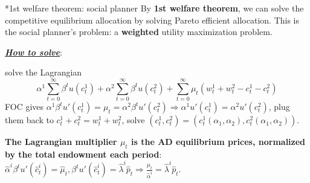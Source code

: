 \documentclass[10pt,landscape,a4paper]{article}
\makeatletter
\renewcommand{\subsubsection}{\@startsection{subsubsection}{1}{0mm}{.2ex}{.2ex}{\bfseries}}
\makeatother
\begin{document}
\begin{multicols*}{3}
\subsubsection*{1st welfare theorem: social planner}
By \textbf{1st welfare theorem}, we can solve the competitive equilibrium allocation by solving Pareto efficient allocation. This is the social planner's problem: a \textbf{weighted} utility maximization problem.

\vspace{2pt}

\vspace{2pt}
\underline{\textit{\textbf{How to solve}}}:
        
solve the Lagrangian
$$\alpha^1 \sum^{\infty}_{t=0}\beta^t u(c_t^1)+\alpha^2 \sum^{\infty}_{t=0}\beta^t u(c_t^2)+\sum^{\infty}_{t=0}\mu_t\left(w_t^1+w_t^2-c_t^1-c_t^2\right)$$
FOC gives $\alpha^1\beta^t u'(c_t^1)=\mu_t=\alpha^2\beta^t u'(c_t^2)\Rightarrow \alpha^1 u'(c_t^1)=\alpha^2 u'(c_t^2)$, plug them back to $c_t^1+c_t^2=w_t^1+w_t^2$, solve $(c_t^1,c_t^2)=\left(c_t^1(\alpha_1,\alpha_2),c_t^2(\alpha_1,\alpha_2)\right)$.

\textbf{The Lagrangian multiplier $\mu_t$ is the AD equilibrium prices, normalized by the total endowment each period}:
$\hat{\alpha}^i\beta^t u'(\hat{c}^i_t)=\hat{\mu}_t,\beta^t u'(\hat{c}^i_t)=\hat{\lambda}^i\hat{p}_t\Rightarrow \frac{\hat{\mu}_t}{\hat{\alpha}^i}=\hat{\lambda}^i\hat{p}_t$.


\end{multicols*}
\end{document}
